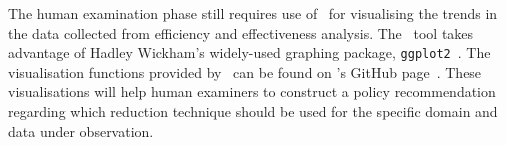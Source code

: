 The human examination phase still requires use of \mr~for visualising the trends in the data collected from efficiency and effectiveness
analysis. The \mr~tool takes advantage of Hadley Wickham's widely-used graphing package, \texttt{ggplot2}~\cite{ggplot2}. The
visualisation functions provided by \mr~can be found on \mr's GitHub page~\cite{tool}. These visualisations will help human examiners
to construct a policy recommendation regarding which reduction technique should be used for the specific domain and data under observation.


